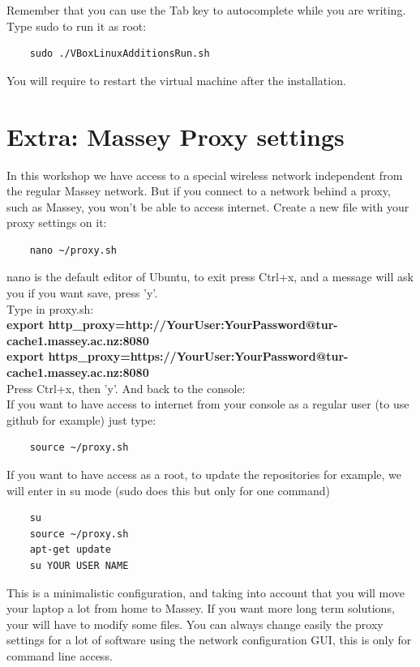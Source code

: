 \documentclass[a4paper]{article}
\begin{document}
Remember that you can use the Tab key to autocomplete while you are writing.\\

Type sudo to run it as root:

\begin{lstlisting}
    sudo ./VBoxLinuxAdditionsRun.sh
\end{lstlisting}

\noindent You will require to restart the virtual machine after the installation.

\section{Extra: Massey Proxy settings}
\label{sec:massey_proxy_settings}
In this workshop we have access to a special wireless network independent from the regular Massey network. But if you connect to a network behind a proxy, such as Massey, you won't be able to access internet. Create a new file with your proxy settings on it: \\
\begin{lstlisting}
    nano ~/proxy.sh
\end{lstlisting}
nano is the default editor of Ubuntu, to exit press Ctrl+x, and a message will ask you if you want save, press 'y'.\\ Type in proxy.sh:\\
\textbf{export http\_proxy=http://YourUser:YourPassword@tur-cache1.massey.ac.nz:8080}\\
\textbf{export https\_proxy=https://YourUser:YourPassword@tur-cache1.massey.ac.nz:8080}\\

Press Ctrl+x, then 'y'. And back to the console:\\

If you want to have access to internet from your console as a regular user (to use github for example) just type:

\begin{lstlisting}
    source ~/proxy.sh
\end{lstlisting}

If you want to have access as a root, to update the repositories for example, we will enter in su mode (sudo does this but only for one command)

\begin{lstlisting}
    su
    source ~/proxy.sh
    apt-get update
    su YOUR USER NAME
\end{lstlisting}
This is a minimalistic configuration, and taking into account that you will move your laptop a lot from home to Massey. If you want more long term solutions, your will have to modify some files. You can always change easily the proxy settings for a lot of software using the network configuration GUI, this is only for command line access.
\end{document}
